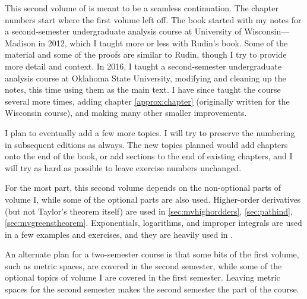 
This second volume of  is meant to
be a seamless continuation.  The chapter numbers start where the
first volume left off.  The book started with my notes for a second-semester
undergraduate analysis course at University of Wisconsin---Madison in 2012, which
I taught more or less with Rudin's book.  Some of the
material and some of the proofs are similar to Rudin, though I try
to provide more detail and context.
In 2016, I taught a second-semester
undergraduate analysis course at Oklahoma State University, modifying
and cleaning up the notes, this time using them as the main text.
I have since taught the course several more times, adding chapter
\ref{approx:chapter} (originally written for the Wisconsin course),
and making many other smaller improvements.

I plan to eventually add a few more topics.
I will try to preserve the numbering in subsequent editions as always.
The new topics planned would add chapters onto the end of the
book, or add sections to the end of existing chapters, and I will try as hard as
possible to leave exercise numbers unchanged.

For the most part, this second volume
depends on the non-optional parts of volume I\@,
while some of the optional parts are also used.
Higher-order derivatives (but not Taylor's theorem
itself) are used
in \ref{sec:mvhighordders}, \ref{sec:pathind},
\ref{sec:mvgreenstheorem}.  Exponentials, logarithms, and improper integrals are
used in a few examples and exercises, and they are heavily used in
.

An alternate plan for a
two-semester course is that some bits of the
first volume, such as metric spaces, are
covered in the second semester, while some of the optional topics of volume
I are covered in the first semester.  Leaving metric spaces for the second
semester makes the second
semester the  part of the course.

